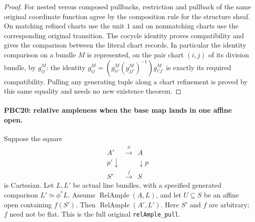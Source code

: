 \documentclass[11pt,a4paper]{article}
\numberwithin{equation}{section}
\theoremstyle{remark}\newtheorem{remark}[theorem]{Remark}
\begin{document}
\begin{proof}
For nested versus composed pullbacks, restriction and pullback
of the same original coordinate function agree by the
composition rule for the structure sheaf.  On matching
refined charts use the unit $1$ and on nonmatching charts
use the corresponding original transition.  The cocycle
identity proves compatibility and gives the comparison
between the literal chart records.  In particular the
identity comparison on a bundle $M$ is represented, on
the pair chart $(i,j)$ of its division bundle, by $g^M_{ij}$:
the identity
$g^M_{ij}=(g^M_{ii'}(g^M_{jj'})^{-1})g^M_{i'j'}$
is exactly its required compatibility.
Pulling any generating tuple along a chart refinement is
proved by this same equality and needs no new existence theorem.
\end{proof}

\paragraph{PBC20: relative ampleness when the base map lands in one affine open.}
\label{claim:PBC20}
Suppose the square
\[
 \begin{array}{ccc}
 A'&\xrightarrow{\phi}&A\\
 p'\downarrow&&\downarrow p\\
 S'&\xrightarrow{f}&S
 \end{array}
                                                        \tag{PBC.40}
\]
is Cartesian.  Let $L,L'$ be actual line bundles, with a
specified generated comparison $L'\simeq\phi^*L$.
Assume $\operatorname{RelAmple}(A,L)$, and let $U\subseteq S$
be an affine open containing $f(S')$.
Then $\operatorname{RelAmple}(A',L')$.
Here $S'$ and $f$ are arbitrary; $f$ need not be flat.
This is the full original \texttt{rel\allowbreak Ample\_\allowbreak pull}.
\end{document}
